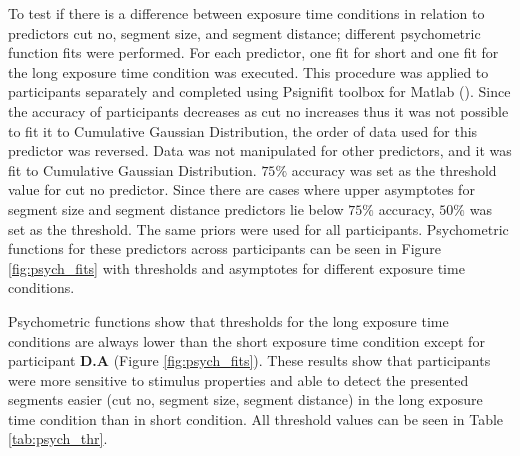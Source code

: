 \documentclass{article}
\begin{document}
To test if there is a difference between exposure time conditions in relation to predictors cut no, segment size, and segment distance; different psychometric function fits were performed. For each predictor, one fit for short and one fit for the long exposure time condition was executed. This procedure was applied to participants separately and completed using Psignifit toolbox for Matlab (\cite{schutt2015psignifit}). Since the accuracy of participants decreases as cut no increases thus it was not possible to fit it to Cumulative Gaussian Distribution, the order of data used for this predictor was reversed. Data was not manipulated for other predictors, and it was fit to Cumulative Gaussian Distribution. $75\%$ accuracy was set as the threshold value for cut no predictor. Since there are cases where upper asymptotes for segment size and segment distance predictors lie below $75\%$ accuracy, $50\%$ was set as the threshold. The same priors were used for all participants. Psychometric functions for these predictors across participants can be seen in Figure \ref{fig:psych_fits} with thresholds and asymptotes for different exposure time conditions.

Psychometric functions show that thresholds for the long exposure time conditions are always lower than the short exposure time condition except for participant \textbf{D.A} (Figure \ref{fig:psych_fits}). These results show that participants were more sensitive to stimulus properties and able to detect the presented segments easier (cut no, segment size, segment distance) in the long exposure time condition than in short condition. All threshold values can be seen in Table \ref{tab:psych_thr}.
\end{document}
